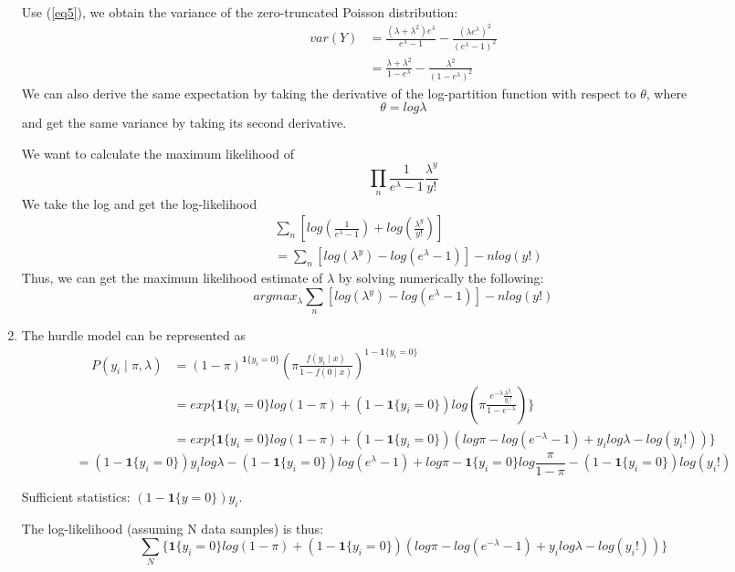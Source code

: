 \begin{enumerate}
\begin{align}
\end{align}
Use (\ref{eq5}), we obtain the variance of the zero-truncated Poisson distribution:
\begin{align}
var(Y) & = \frac{(\lambda + \lambda^2)e^\lambda}{e^\lambda - 1} - \frac{(\lambda e^\lambda)^2}{(e^\lambda - 1)^2} \nonumber \\
& = \frac{\lambda + \lambda^2}{1 - e^\lambda} -  \frac{\lambda^2}{(1 - e^\lambda)^2} \nonumber 
\end{align}
We can also derive the same expectation by taking the derivative of the log-partition function with respect to $\theta$, where
\[
\theta = log\lambda
\]
and get the same variance by taking its second derivative.

We want to calculate the maximum likelihood of 
\[
\prod_{n}\frac{1}{e^\lambda - 1}\frac{\lambda^y}{y!}
\]
We take the log and get the log-likelihood
\begin{align}
& \sum_{n}[log(\frac{1}{e^\lambda - 1}) + log(\frac{\lambda^y}{y!})] \nonumber \\
& = \sum_{n}[log(\lambda^y) - log(e^\lambda - 1)] - nlog(y!) \nonumber
\end{align}
Thus, we can get the maximum likelihood estimate of $\lambda$ by solving numerically the following:
\[
argmax_{\lambda}\sum_{n}[log(\lambda^y) - log(e^\lambda - 1)] - nlog(y!) 
\]

\item The hurdle model can be represented as
\begin{align}
P(y_i \mid \pi, \lambda) & = (1 - \pi)^{\mathbf{1}\{y_i = 0\}}(\pi\frac{f(y_i \mid x)}{1 - f(0 \mid x)})^{1 - \mathbf{1}\{y_i = 0\}} \nonumber \\
& = exp\{\mathbf{1}\{y_i = 0\}log(1-\pi) + (1 - \mathbf{1}\{y_i = 0\})log(\pi\frac{e^{-\lambda}\frac{\lambda^{y_{i}}}{y_{i}!}}{1 - e^{-\lambda}})\} \nonumber \\
& = exp\{\mathbf{1}\{y_i = 0\}log(1-\pi) + (1 - \mathbf{1}\{y_i = 0\})(log\pi - log(e^{-\lambda} - 1) + y_{i}log\lambda - log(y_i!))\} \nonumber 
\end{align}
\[
= (1 - \mathbf{1}\{y_i = 0\})y_{i}log\lambda - (1 - \mathbf{1}\{y_i = 0\})log(e^\lambda - 1) + log\pi - \mathbf{1}\{y_i = 0\}log\frac{\pi}{1 - \pi} - (1 - \mathbf{1}\{y_i = 0\})log(y_{i}!)
\]

Sufficient statistics: $(1 - \mathbf{1}\{y = 0\})y_{i}$.

The log-likelihood (assuming N data samples) is thus:
\[
\sum_{N} \{\mathbf{1}\{y_i = 0\}log(1-\pi) + (1 - \mathbf{1}\{y_i = 0\})(log\pi - log(e^{-\lambda} - 1) + y_{i}log\lambda - log(y_i!))\} 
\]
\end{enumerate}

